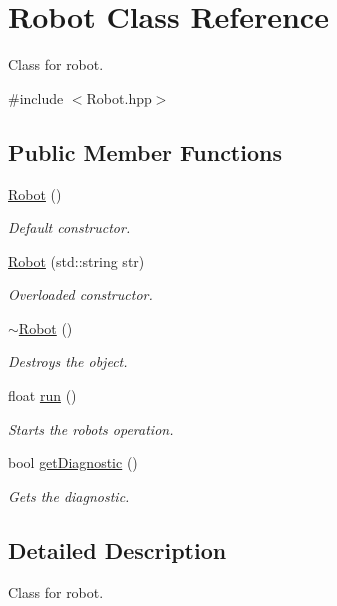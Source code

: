 \hypertarget{class_robot}{}\section{Robot Class Reference}
\label{class_robot}


Class for robot.  




{\ttfamily \#include $<$Robot.\+hpp$>$}

\subsection*{Public Member Functions}
\begin{DoxyCompactItemize}
\item 
\hyperlink{class_robot_a4fc7c70ae20623f05e06f2ecb388b6c4}{Robot} ()
\begin{DoxyCompactList}\small\item\em Default constructor. \end{DoxyCompactList}\item 
\hyperlink{class_robot_a0e6819bf54f9cb47a4147ce6e883ff06}{Robot} (std\+::string str)
\begin{DoxyCompactList}\small\item\em Overloaded constructor. \end{DoxyCompactList}\item 
\hyperlink{class_robot_a924320124b09c2f2ac1621aa210d5f38}{$\sim$\+Robot} ()
\begin{DoxyCompactList}\small\item\em Destroys the object. \end{DoxyCompactList}\item 
float \hyperlink{class_robot_a68db0807318b24bf97b590217687f14a}{run} ()
\begin{DoxyCompactList}\small\item\em Starts the robots operation. \end{DoxyCompactList}\item 
bool \hyperlink{class_robot_aba4678da963cd350bc81934182f49262}{get\+Diagnostic} ()
\begin{DoxyCompactList}\small\item\em Gets the diagnostic. \end{DoxyCompactList}\end{DoxyCompactItemize}


\subsection{Detailed Description}
Class for robot. 

